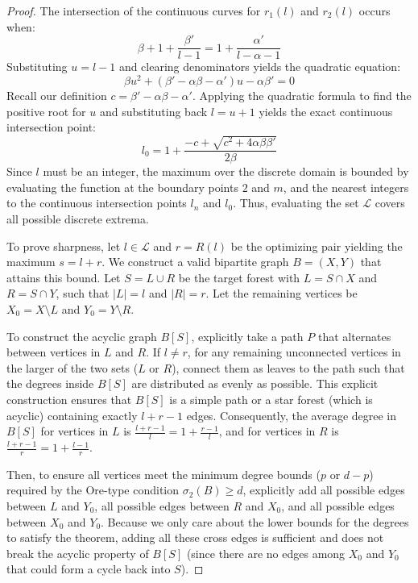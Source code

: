 \documentclass[10pt,a4paper]{amsart}
\begin{document}
\begin{proof}
The intersection of the continuous curves for $r_1(l)$ and $r_2(l)$ occurs when:
\[ \beta + 1 + \frac{\beta'}{l-1} = 1 + \frac{\alpha'}{l - \alpha - 1} \]
Substituting $u = l-1$ and clearing denominators yields the quadratic equation:
\[ \beta u^2 + (\beta' - \alpha \beta - \alpha')u - \alpha \beta' = 0 \]
Recall our definition $c = \beta' - \alpha \beta - \alpha'$. Applying the quadratic formula to find the positive root for $u$ and substituting back $l = u + 1$ yields the exact continuous intersection point:
\[ l_0 = 1 + \frac{-c + \sqrt{c^2 + 4 \alpha \beta \beta'}}{2\beta} \]
Since $l$ must be an integer, the maximum over the discrete domain is bounded by evaluating the function at the boundary points $2$ and $m$, and the nearest integers to the continuous intersection points $l_n$ and $l_0$. Thus, evaluating the set $\mathcal{L}$ covers all possible discrete extrema.

To prove sharpness, let $l \in \mathcal{L}$ and $r = R(l)$ be the optimizing pair yielding the maximum $s = l+r$.
We construct a valid bipartite graph $B = (X, Y)$ that attains this bound.
Let $S = L \cup R$ be the target forest with $L = S \cap X$ and $R = S \cap Y$, such that $|L| = l$ and $|R| = r$. 
Let the remaining vertices be $X_0 = X \setminus L$ and $Y_0 = Y \setminus R$.

To construct the acyclic graph $B[S]$, explicitly take a path $P$ that alternates between vertices in $L$ and $R$. 
If $l \ne r$, for any remaining unconnected vertices in the larger of the two sets ($L$ or $R$), connect them as leaves to the path such that the degrees inside $B[S]$ are distributed as evenly as possible. 
This explicit construction ensures that $B[S]$ is a simple path or a star forest (which is acyclic) containing exactly $l+r-1$ edges. 
Consequently, the average degree in $B[S]$ for vertices in $L$ is $\frac{l+r-1}{l} = 1 + \frac{r-1}{l}$, and for vertices in $R$ is $\frac{l+r-1}{r} = 1 + \frac{l-1}{r}$. 

Then, to ensure all vertices meet the minimum degree bounds ($p$ or $d-p$) required by the Ore-type condition $\sigma_2(B) \ge d$, explicitly add all possible edges between $L$ and $Y_0$, all possible edges between $R$ and $X_0$, and all possible edges between $X_0$ and $Y_0$. 
Because we only care about the lower bounds for the degrees to satisfy the theorem, adding all these cross edges is sufficient and does not break the acyclic property of $B[S]$ (since there are no edges among $X_0$ and $Y_0$ that could form a cycle back into $S$).


\end{proof}
\end{document}
